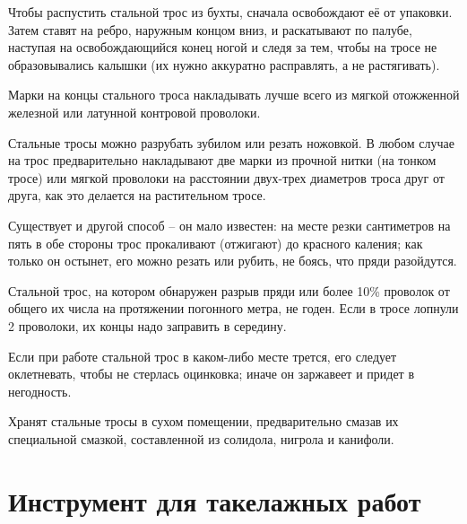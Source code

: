 \documentclass[a4paper, 12pt, twoside, final]{scrbook}
\begin{document}
Чтобы распустить стальной трос из бухты, сначала освобождают её от упаковки. Затем ставят на ребро, наружным концом вниз, и раскатывают по палубе, наступая на освобождающийся конец ногой и следя за тем, чтобы на тросе не образовывались калышки (их нужно аккуратно расправлять, а не растягивать).

Марки на концы стального троса накладывать лучше всего из мягкой отожженной железной или латунной контровой проволоки.

Стальные тросы можно разрубать зубилом или резать ножовкой. В любом случае на трос предварительно накладывают две марки из прочной нитки (на тонком тросе) или мягкой проволоки на расстоянии двух-трех диаметров троса друг от друга, как это делается на растительном тросе.

Существует и другой способ \--- он мало известен: на месте резки сантиметров на пять в обе стороны трос прокаливают (отжигают) до красного каления; как только он остынет, его можно резать или рубить, не боясь, что пряди разойдутся.

Стальной трос, на котором обнаружен разрыв пряди или более 10\% проволок от общего их числа на протяжении погонного метра, не годен. Если в тросе лопнули 2 проволоки, их концы надо заправить в середину.

Если при работе стальной трос в каком-либо месте трется, его следует оклетневать, чтобы не стерлась оцинковка; иначе он заржавеет и придет в негодность.

Хранят стальные тросы в сухом помещении, предварительно смазав их специальной смазкой, составленной из солидола, нигрола и канифоли.

\section{Инструмент для такелажных работ}
\end{document}
